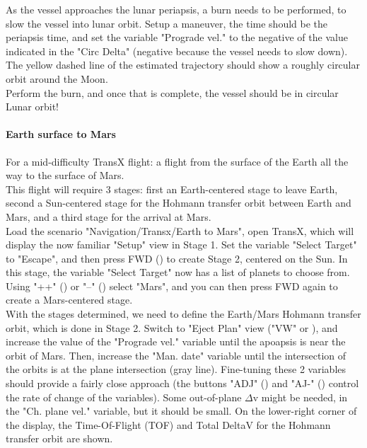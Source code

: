 \documentclass[Orbiter User Manual.tex]{subfiles}
\begin{document}
As the vessel approaches the lunar periapsis, a burn needs to be performed, to slow the vessel into lunar orbit. Setup a maneuver, the time should be the periapsis time, and set the variable "Prograde vel." to the negative of the value indicated in the "Circ Delta" (negative because the vessel needs to slow down). The yellow dashed line of the estimated trajectory should show a roughly circular orbit around the Moon.\\
Perform the burn, and once that is complete, the vessel should be in circular Lunar orbit!\\


\paragraph{Earth surface to Mars}
For a mid-difficulty TransX flight: a flight from the surface of the Earth all the way to the surface of Mars.\\
This flight will require 3 stages: first an Earth-centered stage to leave Earth, second a Sun-centered stage for the Hohmann transfer orbit between Earth and Mars, and a third stage for the arrival at Mars.\\
Load the scenario "Navigation/Transx/Earth to Mars", open TransX, which will display the now familiar "Setup" view in Stage 1. Set the variable "Select Target" to "Escape", and then press FWD (\Shift{}) to create Stage 2, centered on the Sun. In this stage, the variable "Select Target" now has a list of planets to choose from. Using "++" (\Shift\keystroke{=}) or "--" (\Shift\keystroke{-}) select "Mars", and you can then press FWD again to create a Mars-centered stage.\\
With the stages determined, we need to define the Earth/Mars Hohmann transfer orbit, which is done in Stage 2. Switch to "Eject Plan" view ("VW" or \Shift{}), and increase the value of the "Prograde vel." variable until the apoapsis is near the orbit of Mars. Then, increase the "Man. date" variable until the intersection of the orbits is at the plane intersection (gray line). Fine-tuning these 2 variables should provide a fairly close approach (the buttons "ADJ" (\Shift\keystroke{\{}) and "AJ-" (\Shift\keystroke{\}}) control the rate of change of the variables). Some out-of-plane $\Delta$v might be needed, in the "Ch. plane vel." variable, but it should be small. On the lower-right corner of the display, the Time-Of-Flight (TOF) and Total DeltaV for the Hohmann transfer orbit are shown.\\
\end{document}
